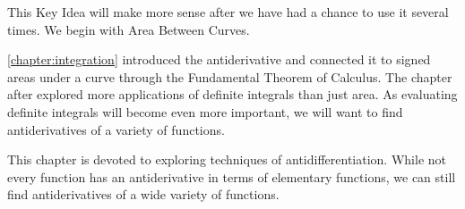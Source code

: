 This Key Idea will make more sense after we have had a chance to use it several times. We begin with Area Between Curves.%









\autoref{chapter:integration} introduced the antiderivative and connected it to signed areas under a curve through the Fundamental Theorem of Calculus. The chapter after explored more applications of definite integrals than just area. As evaluating definite integrals will become even more important, we will want to find antiderivatives of a variety of functions.

This chapter is devoted to exploring techniques of antidifferentiation. While not every function has an antiderivative in terms of elementary functions,
we can still find antiderivatives of a wide variety of functions.









\cleardoublepage

